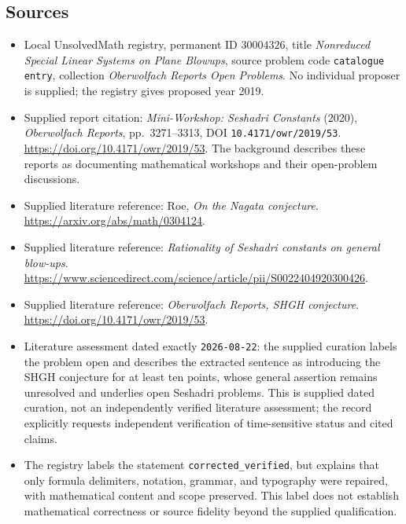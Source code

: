 \documentclass[11pt]{article}
\begin{document}
\subsection{Sources}
\begin{itemize}
\item Local UnsolvedMath registry, permanent ID \(30004326\), title \emph{Nonreduced Special Linear Systems on Plane Blowups}, source problem code \texttt{catalogue entry}, collection \emph{Oberwolfach Reports Open Problems}. No individual proposer is supplied; the registry gives proposed year 2019.
\item Supplied report citation: \emph{Mini-Workshop: Seshadri Constants} (2020), \emph{Oberwolfach Reports}, pp.\ 3271--3313, DOI \texttt{10.4171/owr/2019/53}. \url{https://doi.org/10.4171/owr/2019/53}. The background describes these reports as documenting mathematical workshops and their open-problem discussions.
\item Supplied literature reference: Roe, \emph{On the Nagata conjecture}. \url{https://arxiv.org/abs/math/0304124}.
\item Supplied literature reference: \emph{Rationality of Seshadri constants on general blow-ups}. \url{https://www.sciencedirect.com/science/article/pii/S0022404920300426}.
\item Supplied literature reference: \emph{Oberwolfach Reports, SHGH conjecture}. \url{https://doi.org/10.4171/owr/2019/53}.
\item Literature assessment dated exactly \texttt{2026-08-22}: the supplied curation labels the problem open and describes the extracted sentence as introducing the SHGH conjecture for at least ten points, whose general assertion remains unresolved and underlies open Seshadri problems. This is supplied dated curation, not an independently verified literature assessment; the record explicitly requests independent verification of time-sensitive status and cited claims.
\item The registry labels the statement \texttt{corrected\_verified}, but explains that only formula delimiters, notation, grammar, and typography were repaired, with mathematical content and scope preserved. This label does not establish mathematical correctness or source fidelity beyond the supplied qualification.
\end{itemize}
\end{document}
